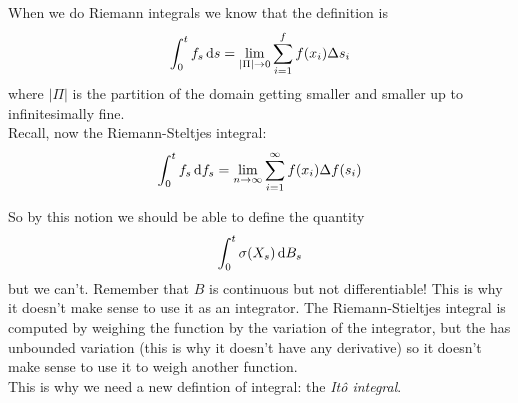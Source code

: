 \documentclass[crop=false, class=article]{standalone}
\begin{document}
\begin{revise}
	When we do Riemann integrals we know that the definition is 
	\begin{equation*}
		\int_{0}^{t}f_{s}\mathop{}\!\mathrm{d} s=\lim_{|\Pi|\to 0}\sum_{i=1}^{f}f(x_{i})\Delta s_{i}
	\end{equation*}
	where $|\Pi|$ is the partition of the domain getting smaller and smaller up to infinitesimally fine.\\
	Recall, now the Riemann-Steltjes integral:
	\begin{equation*}
		\int_{0}^{t}f_{s}\mathop{}\!\mathrm{d} f_{s}=\lim_{n\to\infty}\sum_{i=1}^{\infty}f(x_{i})\Delta f(s_{i})
	\end{equation*}
\end{revise}
	So by this notion we should be able to define the quantity
	\begin{equation*}
		\int_{0}^{t}\sigma(X_{s})\mathop{}\!\mathrm{d} B_{s}
	\end{equation*}
	but we can't. Remember that $B$ is continuous but not differentiable! This is why it doesn't make sense to use it as an integrator. The Riemann-Stieltjes integral is computed by weighing the function by the variation of the integrator, but the \brm{} has unbounded variation (this is why it doesn't have any derivative) so it doesn't make sense to use it to weigh another function. \\
	This is why we need a new defintion of integral: the \emph{It\^o integral}.
\end{document}
